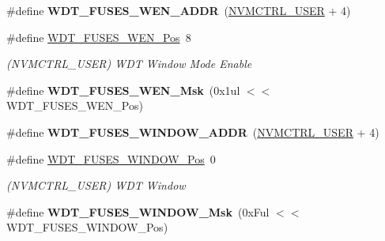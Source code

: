 \begin{DoxyCompactItemize}
\item 
\hypertarget{group__fuses__api_ga9c4f3a13c1cdf6a6f975e5dc304427fc}{}\#define {\bfseries W\+D\+T\+\_\+\+F\+U\+S\+E\+S\+\_\+\+W\+E\+N\+\_\+\+A\+D\+D\+R}~(\hyperlink{group___s_a_m_l21_j18_a__base_ga7a7a83a5753fa323b61536e396083c99}{N\+V\+M\+C\+T\+R\+L\+\_\+\+U\+S\+E\+R} + 4)\label{group__fuses__api_ga9c4f3a13c1cdf6a6f975e5dc304427fc}

\item 
\hypertarget{group__fuses__api_ga87c9e50a26f5095b90217f854536d90f}{}\#define \hyperlink{group__fuses__api_ga87c9e50a26f5095b90217f854536d90f}{W\+D\+T\+\_\+\+F\+U\+S\+E\+S\+\_\+\+W\+E\+N\+\_\+\+Pos}~8\label{group__fuses__api_ga87c9e50a26f5095b90217f854536d90f}

\begin{DoxyCompactList}\small\item\em (N\+V\+M\+C\+T\+R\+L\+\_\+\+U\+S\+E\+R) W\+D\+T Window Mode Enable \end{DoxyCompactList}\item 
\hypertarget{group__fuses__api_gad6114332dfc7f6b0dd36326af632aa9d}{}\#define {\bfseries W\+D\+T\+\_\+\+F\+U\+S\+E\+S\+\_\+\+W\+E\+N\+\_\+\+Msk}~(0x1ul $<$$<$ W\+D\+T\+\_\+\+F\+U\+S\+E\+S\+\_\+\+W\+E\+N\+\_\+\+Pos)\label{group__fuses__api_gad6114332dfc7f6b0dd36326af632aa9d}

\item 
\hypertarget{group__fuses__api_ga8cb41a759d20fdb67c4481d6e426bddb}{}\#define {\bfseries W\+D\+T\+\_\+\+F\+U\+S\+E\+S\+\_\+\+W\+I\+N\+D\+O\+W\+\_\+\+A\+D\+D\+R}~(\hyperlink{group___s_a_m_l21_j18_a__base_ga7a7a83a5753fa323b61536e396083c99}{N\+V\+M\+C\+T\+R\+L\+\_\+\+U\+S\+E\+R} + 4)\label{group__fuses__api_ga8cb41a759d20fdb67c4481d6e426bddb}

\item 
\hypertarget{group__fuses__api_ga79ba176ad4ff912b404632c0d0f7541e}{}\#define \hyperlink{group__fuses__api_ga79ba176ad4ff912b404632c0d0f7541e}{W\+D\+T\+\_\+\+F\+U\+S\+E\+S\+\_\+\+W\+I\+N\+D\+O\+W\+\_\+\+Pos}~0\label{group__fuses__api_ga79ba176ad4ff912b404632c0d0f7541e}

\begin{DoxyCompactList}\small\item\em (N\+V\+M\+C\+T\+R\+L\+\_\+\+U\+S\+E\+R) W\+D\+T Window \end{DoxyCompactList}\item 
\hypertarget{group__fuses__api_ga3b61acb6adfdb396d6e584470b8f38e7}{}\#define {\bfseries W\+D\+T\+\_\+\+F\+U\+S\+E\+S\+\_\+\+W\+I\+N\+D\+O\+W\+\_\+\+Msk}~(0x\+Ful $<$$<$ W\+D\+T\+\_\+\+F\+U\+S\+E\+S\+\_\+\+W\+I\+N\+D\+O\+W\+\_\+\+Pos)\label{group__fuses__api_ga3b61acb6adfdb396d6e584470b8f38e7}


\end{DoxyCompactItemize}
